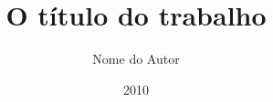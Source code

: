 \documentclass[pt,prepmei,twoside,12pt]{thesisdifctunl}
\title{O título do trabalho}
\author{Nome do Autor}
\date{2010}
\begin{document}
\frontmatter

\frontpage
\presentationpage
\printdedicatory
\printacknowledgements
\printabstract

\tableofcontents
\printotherlists


\printchapters

\printbibliography

\printappendixes 

\end{document}
